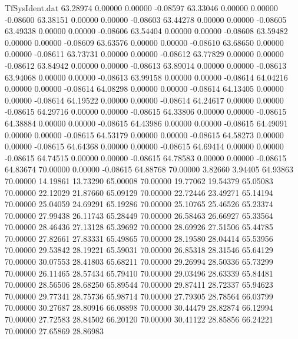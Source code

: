 \begin{filecontents}{TfSysIdent.dat}
  63.28974    0.00000    0.00000   -0.08597
  63.33046    0.00000    0.00000   -0.08600
  63.38151    0.00000    0.00000   -0.08603
  63.44278    0.00000    0.00000   -0.08605
  63.49338    0.00000    0.00000   -0.08606
  63.54404    0.00000    0.00000   -0.08608
  63.59482    0.00000    0.00000   -0.08609
  63.63576    0.00000    0.00000   -0.08610
  63.68650    0.00000    0.00000   -0.08611
  63.73731    0.00000    0.00000   -0.08612
  63.77829    0.00000    0.00000   -0.08612
  63.84942    0.00000    0.00000   -0.08613
  63.89014    0.00000    0.00000   -0.08613
  63.94068    0.00000    0.00000   -0.08613
  63.99158    0.00000    0.00000   -0.08614
  64.04216    0.00000    0.00000   -0.08614
  64.08298    0.00000    0.00000   -0.08614
  64.13405    0.00000    0.00000   -0.08614
  64.19522    0.00000    0.00000   -0.08614
  64.24617    0.00000    0.00000   -0.08615
  64.29716    0.00000    0.00000   -0.08615
  64.33806    0.00000    0.00000   -0.08615
  64.38884    0.00000    0.00000   -0.08615
  64.43986    0.00000    0.00000   -0.08615
  64.49091    0.00000    0.00000   -0.08615
  64.53179    0.00000    0.00000   -0.08615
  64.58273    0.00000    0.00000   -0.08615
  64.64368    0.00000    0.00000   -0.08615
  64.69414    0.00000    0.00000   -0.08615
  64.74515    0.00000    0.00000   -0.08615
  64.78583    0.00000    0.00000   -0.08615
  64.83674   70.00000    0.00000   -0.08615
  64.88768   70.00000    3.82660    3.94405
  64.93863   70.00000   14.19861   13.73290
  65.00008   70.00000   19.77062   19.54379
  65.05083   70.00000   22.12029   21.87660
  65.09129   70.00000   22.72446   23.49271
  65.14194   70.00000   25.04059   24.69291
  65.19286   70.00000   25.10765   25.46526
  65.23374   70.00000   27.99438   26.11743
  65.28449   70.00000   26.58463   26.66927
  65.33564   70.00000   28.46436   27.13128
  65.39692   70.00000   28.69926   27.51506
  65.44785   70.00000   27.82661   27.83331
  65.49865   70.00000   28.19580   28.04414
  65.53956   70.00000   29.53842   28.19221
  65.59031   70.00000   26.85318   28.31546
  65.64129   70.00000   30.07553   28.41803
  65.68211   70.00000   29.26994   28.50336
  65.73299   70.00000   26.11465   28.57434
  65.79410   70.00000   29.03496   28.63339
  65.84481   70.00000   28.56506   28.68250
  65.89544   70.00000   29.87411   28.72337
  65.94623   70.00000   29.77341   28.75736
  65.98714   70.00000   27.79305   28.78564
  66.03799   70.00000   30.27687   28.80916
  66.08898   70.00000   30.44479   28.82874
  66.12994   70.00000   27.72583   28.84502
  66.20120   70.00000   30.41122   28.85856
  66.24221   70.00000   27.65869   28.86983

\end{filecontents}
